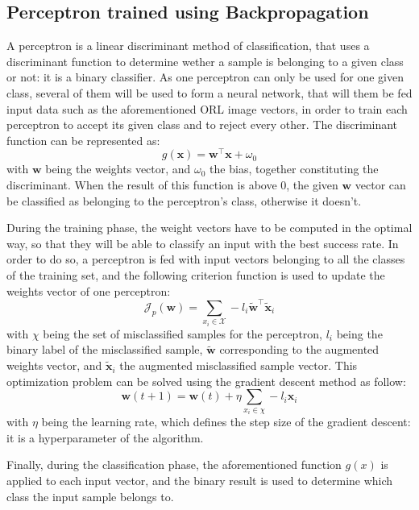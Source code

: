 \subsection{Perceptron trained using Backpropagation}
A perceptron is a linear discriminant method of classification, that uses a discriminant function to determine wether a sample is belonging to a given class or not: it is a binary classifier. As one perceptron can only be used for one given class, several of them will be used to form a neural network, that will them be fed input data such as the aforementioned ORL image vectors, in order to train each perceptron to accept its given class and to reject every other. The discriminant function can be represented as:
\begin{equation}
  g(\mathbf{x})=\mathbf{w}^\top\mathbf{x}+\omega_{0}
\end{equation}
with $\mathbf{w}$ being the weights vector, and $\omega_{0}$ the bias, together constituting the discriminant. When the result of this function is above 0, the given $\mathbf{w}$ vector can be classified as belonging to the perceptron's class, otherwise it doesn't.

During the training phase, the weight vectors have to be computed in the optimal way, so that they will be able to classify an input with the best success rate. In order to do so, a perceptron is fed with input vectors belonging to all the classes of the training set, and the following criterion function is used to update the weights vector of one perceptron:
\begin{equation}
  \mathcal{J}_p(\mathbf{w}) = \sum_{x_i \in \mathcal{X}} -l_i \tilde{\mathbf{w}}^\top \tilde{\mathbf{x}}_i
  \label{eq:perceptron}
\end{equation}
with $\chi$ being the set of misclassified samples for the perceptron, $l_i$ being the binary label of the misclassified sample, $\tilde{\mathbf{w}}$ corresponding to the augmented weights vector, and $\tilde{\mathbf{x}}_i$ the augmented misclassified sample vector. This optimization problem can be solved using the gradient descent method as follow:
\begin{equation}
  \mathbf{w}(t+1)=\mathbf{w}(t)+\eta \sum_{x_i \in \chi}-l_{i}\mathbf{x}_{i}
\end{equation}
with $\eta$ being the learning rate, which defines the step size of the gradient descent: it is a hyperparameter of the algorithm.

Finally, during the classification phase, the aforementioned function $g(x)$ is applied to each input vector, and the binary result is used to determine which class the input sample belongs to.

